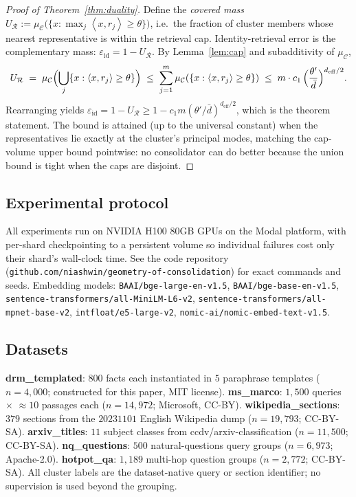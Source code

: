 \documentclass[11pt]{article}
\theoremstyle{definition}
\theoremstyle{remark}
\newcommand{\deff}{d_{\mathrm{eff}}}
\newcommand{\dbar}{\bar{d}}
\newcommand{\thetap}{\theta'}
\newcommand{\clusterset}{\mathcal{C}}
\newcommand{\reps}{\mathcal{R}}
\newcommand{\inner}[2]{\left\langle#1,#2\right\rangle}
\newcommand{\eps}{\varepsilon}
\begin{document}
\begin{proof}[Proof of Theorem~\ref{thm:duality}]
Define the \emph{covered mass}
$U_\reps := \mu_\clusterset\bigl(\{x : \max_j \inner{x}{r_j} \geq \theta\}\bigr)$,
i.e.\ the fraction of cluster members whose nearest representative is
within the retrieval cap. Identity-retrieval error is the complementary
mass: $\eps_{\mathrm{id}} = 1 - U_\reps$.
By Lemma~\ref{lem:cap} and subadditivity of $\mu_\clusterset$,
\[
U_\reps \;=\; \mu_\clusterset\Bigl(\bigcup_j \{x : \inner{x}{r_j} \geq \theta\}\Bigr)
\;\leq\; \sum_{j=1}^m \mu_\clusterset(\{x : \inner{x}{r_j} \geq \theta\})
\;\leq\; m \cdot c_1\,\Bigl(\frac{\thetap}{\dbar}\Bigr)^{\deff/2}.
\]
Rearranging yields
$\eps_{\mathrm{id}} = 1 - U_\reps \geq 1 - c_1 m (\thetap/\dbar)^{\deff/2}$,
which is the theorem statement. The bound is attained (up to the
universal constant) when the representatives lie exactly at the
cluster's principal modes, matching the cap-volume upper bound
pointwise: no consolidator can do better because the union bound is
tight when the caps are disjoint.
\end{proof}

\subsection*{Experimental protocol}
All experiments run on NVIDIA H100 80GB GPUs on the Modal platform, with
per-shard checkpointing to a persistent volume so individual failures cost
only their shard's wall-clock time. See the code repository
(\texttt{github.com/niashwin/geometry-of-consolidation}) for exact commands
and seeds. Embedding models: \texttt{BAAI/bge-large-en-v1.5}, \texttt{BAAI/bge-base-en-v1.5},
\texttt{sentence-transformers/all-MiniLM-L6-v2},
\texttt{sentence-transformers/all-mpnet-base-v2},
\texttt{intfloat/e5-large-v2}, \texttt{nomic-ai/nomic-embed-text-v1.5}.

\subsection*{Datasets}
\textbf{drm\_templated}: $800$ facts each instantiated in $5$ paraphrase
templates ($n{=}4{,}000$; constructed for this paper, MIT license).
\textbf{ms\_marco}: $1{,}500$ queries $\times$ $\approx 10$ passages each
($n{=}14{,}972$; Microsoft, CC-BY).
\textbf{wikipedia\_sections}: $379$ sections from the $20231101$ English
Wikipedia dump ($n{=}19{,}793$; CC-BY-SA).
\textbf{arxiv\_titles}: $11$ subject classes from ccdv/arxiv-classification
($n{=}11{,}500$; CC-BY-SA).
\textbf{nq\_questions}: $500$ natural-questions query groups
($n{=}6{,}973$; Apache-2.0).
\textbf{hotpot\_qa}: $1{,}189$ multi-hop question groups
($n{=}2{,}772$; CC-BY-SA). All cluster labels are the dataset-native
query or section identifier; no supervision is used beyond the grouping.
\end{document}
